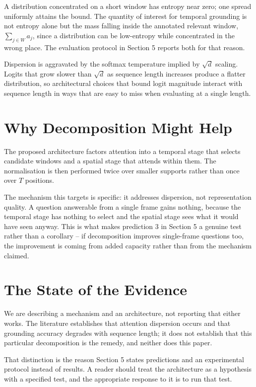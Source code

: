 \documentclass{article}
\begin{document}
A distribution concentrated on a short window has entropy near zero; one spread uniformly attains the bound. The quantity of interest for temporal grounding is not entropy alone but the mass falling inside the annotated relevant window, $\sum_{j \in W} a_j$, since a distribution can be low-entropy while concentrated in the wrong place. The evaluation protocol in Section 5 reports both for that reason.

Dispersion is aggravated by the softmax temperature implied by $\sqrt{d}$ scaling. Logits that grow slower than $\sqrt{d}$ as sequence length increases produce a flatter distribution, so architectural choices that bound logit magnitude interact with sequence length in ways that are easy to miss when evaluating at a single length.


\section{Why Decomposition Might Help}


The proposed architecture factors attention into a temporal stage that selects candidate windows and a spatial stage that attends within them. The normalisation is then performed twice over smaller supports rather than once over $T$ positions.

The mechanism this targets is specific: it addresses dispersion, not representation quality. A question answerable from a single frame gains nothing, because the temporal stage has nothing to select and the spatial stage sees what it would have seen anyway. This is what makes prediction 3 in Section 5 a genuine test rather than a corollary -- if decomposition improves single-frame questions too, the improvement is coming from added capacity rather than from the mechanism claimed.


\section{The State of the Evidence}


We are describing a mechanism and an architecture, not reporting that either works. The literature establishes that attention dispersion occurs and that grounding accuracy degrades with sequence length; it does not establish that this particular decomposition is the remedy, and neither does this paper.

That distinction is the reason Section 5 states predictions and an experimental protocol instead of results. A reader should treat the architecture as a hypothesis with a specified test, and the appropriate response to it is to run that test.



\par\vspace{0.5em}


\end{document}
